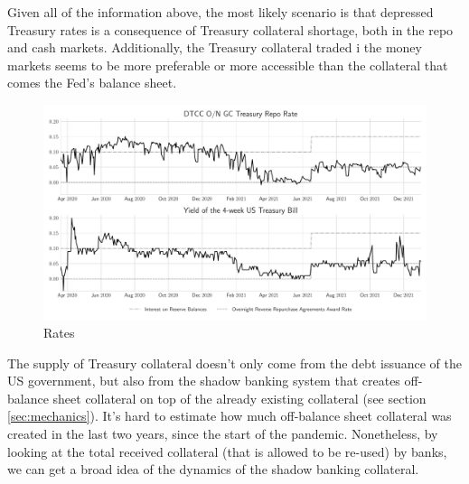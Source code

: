 \documentclass[11pt,a4paper,english,oneside]{article}
\begin{document}
Given all of the information above, the most likely scenario is that depressed Treasury rates is a consequence of Treasury collateral shortage, both in the repo and cash markets. Additionally, the Treasury collateral traded i the money markets seems to be more preferable or more accessible than the collateral that comes the Fed's balance sheet.

\begin{figure}[htb!]
  \begin{center}
    \caption{Rates}
    \includegraphics[width=0.99\linewidth]{rates.pdf}
  \end{center}
  \label{fig:rates}
\end{figure}

The supply of Treasury collateral doesn't only come from the debt issuance of the US government, but also from the shadow banking system that creates off-balance sheet collateral on top of the already existing collateral (see section \ref{sec:mechanics}). It's hard to estimate how much off-balance sheet collateral was created in the last two years, since the start of the pandemic. Nonetheless, by looking at the total received collateral (that is allowed to be re-used) by banks, we can get a broad idea of the dynamics of the shadow banking collateral.
\end{document}
